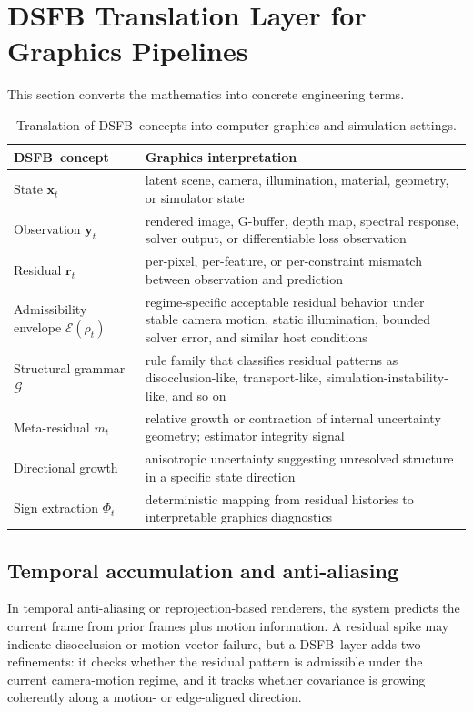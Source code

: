 \documentclass[11pt,letterpaper]{article}
\newcommand{\dsfb}{\textsc{DSFB}}
\newcommand{\admiss}{\mathcal{E}}
\newcommand{\grammar}{\mathcal{G}}
\newcommand{\state}{\mathbf{x}}
\newcommand{\obs}{\mathbf{y}}
\newcommand{\resid}{\mathbf{r}}
\newcommand{\metares}{m}
\theoremstyle{gcresult}
\theoremstyle{definition}
\begin{document}
\section{DSFB Translation Layer for Graphics Pipelines}

This section converts the mathematics into concrete engineering terms.

\begin{table}[H]
\centering
\caption{Translation of \dsfb\ concepts into computer graphics and simulation settings.}
\label{tab:translation}
\begin{tabularx}{\textwidth}{>{\raggedright\arraybackslash}p{} >{\raggedright\arraybackslash}X}
\toprule
\textbf{\dsfb\ concept} & \textbf{Graphics interpretation} \\
\midrule
State $\state_t$ & latent scene, camera, illumination, material, geometry, or simulator state \\
Observation $\obs_t$ & rendered image, G-buffer, depth map, spectral response, solver output, or differentiable loss observation \\
Residual $\resid_t$ & per-pixel, per-feature, or per-constraint mismatch between observation and prediction \\
Admissibility envelope $\admiss(\rho_t)$ & regime-specific acceptable residual behavior under stable camera motion, static illumination, bounded solver error, and similar host conditions \\
Structural grammar $\grammar$ & rule family that classifies residual patterns as disocclusion-like, transport-like, simulation-instability-like, and so on \\
Meta-residual $\metares_t$ & relative growth or contraction of internal uncertainty geometry; estimator integrity signal \\
Directional growth & anisotropic uncertainty suggesting unresolved structure in a specific state direction \\
Sign extraction $\Phi_t$ & deterministic mapping from residual histories to interpretable graphics diagnostics \\
\bottomrule
\end{tabularx}
\end{table}

\subsection{Temporal accumulation and anti-aliasing}
In temporal anti-aliasing or reprojection-based renderers, the system predicts the current frame from prior frames plus motion information. A residual spike may indicate disocclusion or motion-vector failure, but a \dsfb\ layer adds two refinements: it checks whether the residual pattern is admissible under the current camera-motion regime, and it tracks whether covariance is growing coherently along a motion- or edge-aligned direction.
\end{document}
